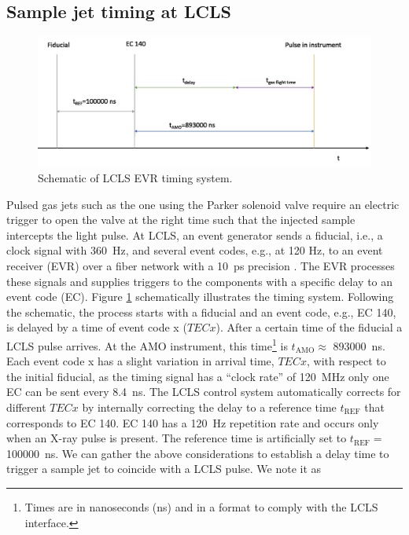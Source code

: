 \subsection{Sample jet timing at LCLS}\label{sec:jet-timing}
\begin{figure}
	\centering
		\includegraphics[width=1.00\textwidth]{images/LCLS-timing-schematic.png}
	\caption{Schematic of LCLS EVR timing system.}
	\label{fig:LCLS-EVR-timing}
\end{figure}
Pulsed gas jets such as the one using the Parker solenoid valve require an electric trigger to open the valve at the right time such that the injected sample intercepts the light pulse. At LCLS, an event generator sends a fiducial, i.e., a clock signal with \SI{360}{\hertz}, and several event codes, e.g., at 120 Hz, to an event receiver (EVR) over a fiber network with a \SI{10}{\pico\second} precision \citep{Krejcik-2007-DIPAC}. The EVR processes these signals and supplies triggers to the components with a specific delay to an event code (EC). Figure \ref{fig:LCLS-EVR-timing} schematically illustrates the timing system. Following the schematic, the process starts with a fiducial and an event code, e.g., EC 140, is delayed by a time of event code x ($TECx$). After a certain time of the fiducial a LCLS pulse arrives. At the AMO instrument, this time\footnote{Times are in nanoseconds (ns) and in a format to comply with the LCLS interface.} is $t_{\text{AMO}}\approx$ \SI{893000}{\nano\second}. Each event code x has a slight variation in arrival time, $TECx$, with respect to the initial fiducial, as the timing signal has a ``clock rate'' of \SI{120}{\mega\hertz} only one EC can be sent every \SI{8.4}{\nano\second}. The LCLS control system automatically corrects for different $TECx$ by internally correcting the delay to a reference time $t_{\text{REF}}$ that corresponds to EC 140. EC 140 has a \SI{120}{\hertz} repetition rate and occurs only when an X-ray pulse is present. The reference time is artificially set to $t_{\text{REF}}=$ \SI{100000}{\nano\second}. We can gather the above considerations to establish a delay time to trigger a sample jet to coincide with a LCLS pulse. We note it as
